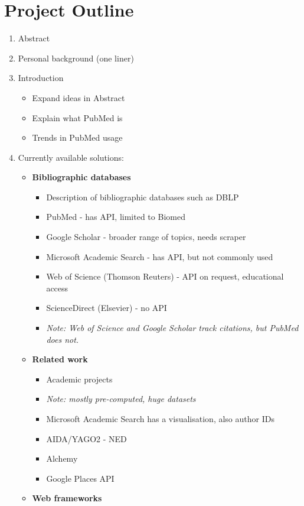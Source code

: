 \documentclass[a4paper,12pt]{article}
\begin{document}
\section{Project Outline}
\begin{enumerate}
	\item Abstract
	\item Personal background (one liner)
	\item Introduction
	\begin{itemize}
		\item Expand ideas in Abstract
		\item Explain what PubMed is
		\item Trends in PubMed usage
		\end{itemize}
	\item Currently available solutions:
	\begin{itemize}
		\item \textbf{Bibliographic databases}
		\begin{itemize}
			\item Description of bibliographic databases such as DBLP
			\item PubMed - has API, limited to Biomed
			\item Google Scholar - broader range of topics, needs scraper
			\item Microsoft Academic Search - has API, but not commonly used
			\item Web of Science (Thomson Reuters) - API on request, educational access
			\item ScienceDirect (Elsevier) - no API
			\item \emph{Note: Web of Science and Google Scholar track citations, but PubMed does not.}
		\end{itemize}
		\item \textbf{Related work}
		\begin{itemize}
			\item Academic projects 
			\item \emph{Note: mostly pre-computed, huge datasets}
			\item Microsoft Academic Search has a visualisation, also author IDs
			\item AIDA/YAGO2 - NED
			\item Alchemy
			\item Google Places API
		\end{itemize}
		\item \textbf{Web frameworks}
		\begin{itemize}

\end{itemize}
\end{itemize}
\end{enumerate}
\end{document}
